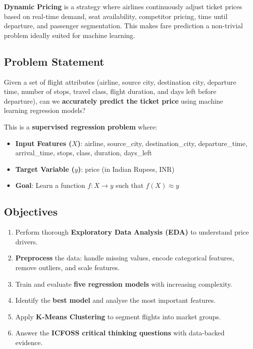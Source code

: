 \documentclass[12pt, a4paper]{article}
\begin{document}
\begin{keyterm}
\textbf{Dynamic Pricing} is a strategy where airlines continuously adjust ticket prices based on real-time demand, seat availability, competitor pricing, time until departure, and passenger segmentation. This makes fare prediction a non-trivial problem ideally suited for machine learning.
\end{keyterm}

\subsection{Problem Statement}

\begin{importantbox}
Given a set of flight attributes (airline, source city, destination city, departure time, number of stops, travel class, flight duration, and days left before departure), can we \textbf{accurately predict the ticket price} using machine learning regression models?
\end{importantbox}

This is a \textbf{supervised regression problem} where:
\begin{itemize}[leftmargin=*]
    \item \textbf{Input Features ($X$)}: airline, source\_city, destination\_city, departure\_time, arrival\_time, stops, class, duration, days\_left
    \item \textbf{Target Variable ($y$)}: price (in Indian Rupees, INR)
    \item \textbf{Goal}: Learn a function $f: X \rightarrow y$ such that $f(X) \approx y$
\end{itemize}

\subsection{Objectives}

\begin{enumerate}[leftmargin=*]
    \item Perform thorough \textbf{Exploratory Data Analysis (EDA)} to understand price drivers.
    \item \textbf{Preprocess} the data: handle missing values, encode categorical features, remove outliers, and scale features.
    \item Train and evaluate \textbf{five regression models} with increasing complexity.
    \item Identify the \textbf{best model} and analyse the most important features.
    \item Apply \textbf{K-Means Clustering} to segment flights into market groups.
    \item Answer the \textbf{ICFOSS critical thinking questions} with data-backed evidence.
\end{enumerate}
\end{document}
